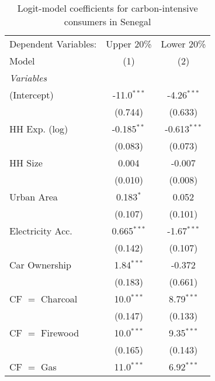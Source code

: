 
\begin{table}[htbp!]
   \centering
   \small
   \begin{adjustbox}{width = 1\textwidth, max height = 0.95\textheight, center}
      \begin{threeparttable}[b]
         \caption{\label{tab:Logit_1_SEN} Logit-model coefficients for carbon-intensive consumers in Senegal}
         \begin{tabular}{lcc}
            \tabularnewline \midrule \midrule
            Dependent Variables: & Upper 20\%    & Lower 20\%\\   
            Model                & (1)           & (2)\\  
            \midrule
            \emph{Variables}\\
            (Intercept)          & -11.0$^{***}$ & -4.26$^{***}$\\   
                                 & (0.744)       & (0.633)\\   
            HH Exp. (log)        & -0.185$^{**}$ & -0.613$^{***}$\\   
                                 & (0.083)       & (0.073)\\   
            HH Size              & 0.004         & -0.007\\   
                                 & (0.010)       & (0.008)\\   
            Urban Area           & 0.183$^{*}$   & 0.052\\   
                                 & (0.107)       & (0.101)\\   
            Electricity Acc.     & 0.665$^{***}$ & -1.67$^{***}$\\   
                                 & (0.142)       & (0.107)\\   
            Car Ownership        & 1.84$^{***}$  & -0.372\\   
                                 & (0.183)       & (0.661)\\   
            CF $=$ Charcoal      & 10.0$^{***}$  & 8.79$^{***}$\\   
                                 & (0.147)       & (0.133)\\   
            CF $=$ Firewood      & 10.0$^{***}$  & 9.35$^{***}$\\   
                                 & (0.165)       & (0.143)\\   
            CF $=$ Gas           & 11.0$^{***}$  & 6.92$^{***}$\\   

\end{tabular}
\end{threeparttable}
\end{adjustbox}
\end{table}
